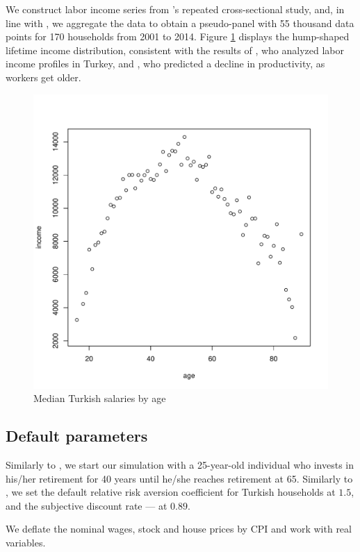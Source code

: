 \documentclass[]{elsarticle}
\begin{document}
We construct labor income series from \citet{tuik}'s repeated cross-sectional study, and, in line with \citet{aktug}, we aggregate the data to obtain a pseudo-panel with 55 thousand data points for 170 households from 2001 to 2014. Figure \ref{fig:tuik} displays the hump-shaped lifetime income distribution, consistent with the results of \citet{aktug}, who analyzed labor income profiles in Turkey, and \citet{benporath}, who predicted a decline in productivity, as workers get older.

\begin{figure}[h!]
	\centering
	\includegraphics[scale=0.4]{figs/wage2median.pdf}
	\caption{Median Turkish salaries by age}
	\label{fig:tuik}
\end{figure}

\subsection{Default parameters}
Similarly to \citet{munk}, we start our simulation with a 25-year-old individual who invests in his/her retirement for 40 years until he/she reaches retirement at 65. Similarly to \citet{torul}, we set the default relative risk aversion coefficient for Turkish households at $1.5$, and the subjective discount rate --- at $0.89$.

We deflate the nominal wages, stock and house prices by CPI and work with real variables.
\end{document}
